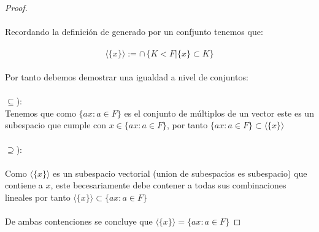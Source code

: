 \documentclass[11pt,letterpaper]{article}
\begin{document}
\begin{proof}\,\\
    \,\\
    Recordando la definici\'on de generado por un confjunto tenemos que:\,\\
    \,\\
    \begin{equation*}
       \langle\{x\}\rangle:=\cap\,\{K<F| \{x\}\subset K\}
    \end{equation*}\,\\
    Por tanto debemos demostrar una igualdad a nivel de conjuntos:\,\\
    \,\\
    $\subseteq$):\,\\
    Tenemos que como $\{ax:a\in F\}$ es el conjunto de m\'ultiplos de un vector este es 
    un subespacio que cumple con $x\in \{ax:a\in F\} $, por tanto $\{ax:a\in F\}\subset\langle\{x\}\rangle$\,\\
    \,\\
    $\supseteq$):\,\\
    \,\\
    Como $\langle\{x\}\rangle$ es un subespacio vectorial (union de subespacios es subespacio) que contiene a $x$, este becesariamente debe contener a todas
    sus combinaciones lineales por tanto $\langle\{x\}\rangle\subset\{ax:a\in F\}$\,\\
    \,\\
    De ambas contenciones se concluye que $\langle\{x\}\rangle=\{ax:a\in F\}$
\end{proof}\,\\
\end{document}
